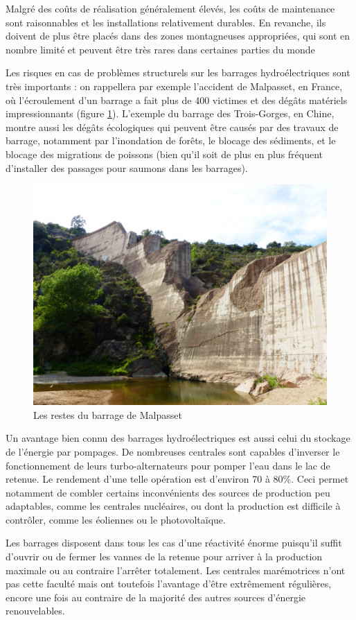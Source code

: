 \documentclass[12pt,a4paper,oneside,openany]{memoir}
\begin{document}
Malgré des coûts de réalisation généralement élevés, les coûts de maintenance sont raisonnables et les installations relativement durables. En revanche, ils doivent de plus être placés dans des zones montagneuses appropriées, qui sont en nombre limité et peuvent être très rares dans certaines parties du monde\textellipsis

Les risques en cas de problèmes structurels sur les barrages hydroélectriques sont très importants : on rappellera par exemple l'accident de Malpasset, en France, où l'écroulement d'un barrage a fait plus de 400 victimes et des dégâts matériels impressionnants (figure \ref{fig:malpasset}). L'exemple du barrage des Trois-Gorges, en Chine, montre aussi les dégâts écologiques qui peuvent être causés par des travaux de barrage, notamment par l'inondation de forêts, le blocage des sédiments, et le blocage des migrations de poissons (bien qu'il soit de plus en plus fréquent d'installer des passages pour saumons dans les barrages).

\begin{figure}
\centering
\includegraphics[width=0.9\linewidth]{img/malpasset.jpg}
\caption{Les restes du barrage de Malpasset}
\label{fig:malpasset}
\end{figure}

Un avantage bien connu des barrages hydroélectriques est aussi celui du stockage de l'énergie par pompages. De nombreuses centrales sont capables d'inverser le fonctionnement de leurs turbo-alternateurs pour pomper l'eau dans le lac de retenue. Le rendement d'une telle opération est d'environ 70 à 80\%. Ceci permet notamment de combler certains inconvénients des sources de production peu adaptables, comme les centrales nucléaires, ou dont la production est difficile à contrôler, comme les éoliennes ou le photovoltaïque.

Les barrages disposent dans tous les cas d'une réactivité énorme puisqu'il suffit d'ouvrir ou de fermer les vannes de la retenue pour arriver à la production maximale ou au contraire l'arrêter totalement. Les centrales marémotrices n'ont pas cette faculté mais ont toutefois l'avantage d'être extrêmement régulières, encore une fois au contraire de la majorité des autres sources d'énergie renouvelables.

\begin{thebibliography}{abc}
	\nocite{*}
	\printbibliography
\end{thebibliography}
\end{document}
